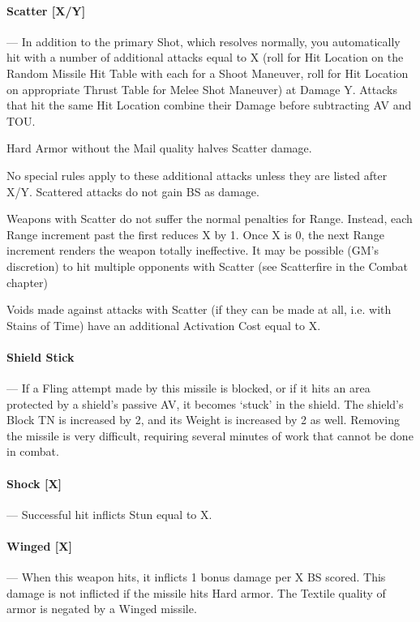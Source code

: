\documentclass[oneside,11pt,english]{book}
\begin{document}
\vspace{-5pt}\paragraph[Scatter]{\label{rangequal:Scatter [X/Y]}Scatter [X/Y]}---\quad 
In addition to the primary Shot, which resolves normally, you automatically hit with a number of 
additional attacks equal to X (roll for Hit Location on the Random Missile Hit Table with each for a 
Shoot Maneuver, roll for Hit Location on appropriate Thrust Table for Melee Shot Maneuver) at 
Damage Y. Attacks that hit the same Hit Location combine their Damage before subtracting AV and 
TOU. 

Hard Armor without the Mail quality halves Scatter damage.

No special rules apply to these additional attacks unless they are listed after X/Y. Scattered attacks do 
not gain BS as damage. 

Weapons with Scatter do not suffer the normal penalties for Range. Instead, each Range increment 
past the first reduces X by 1. Once X is 0, the next Range increment renders the weapon totally 
ineffective. It may be possible (GM’s discretion) to hit multiple opponents with Scatter (see 
Scatterfire in the Combat chapter) 

Voids made against attacks with Scatter (if they can be made at all, i.e. with Stains of Time) have an 
additional Activation Cost equal to X. 

\vspace{-5pt}\paragraph{Shield Stick}\label{rangequal:Shield Stick}
---\quad 
If a Fling attempt made by this missile is blocked, or if it hits an area protected by a shield’s passive 
AV, it becomes ‘stuck’ in the shield. The shield’s Block TN is increased by 2, and its Weight is 
increased by 2 as well. Removing the missile is very difficult, requiring several minutes of work that 
cannot be done in combat. 

\vspace{-5pt}\paragraph[Shock]{Shock [X]}\label{rangequal:Shock [X]}
---\quad 
Successful hit inflicts Stun equal to X. 

\vspace{-5pt}\paragraph[Winged]{\label{rangequal:Winged [X]}Winged [X]}
---\quad
When this weapon hits, it inflicts 1 bonus damage per X BS scored. This damage is not inflicted if the 
missile hits Hard armor. The Textile quality of armor is negated by a Winged missile.
\end{document}
